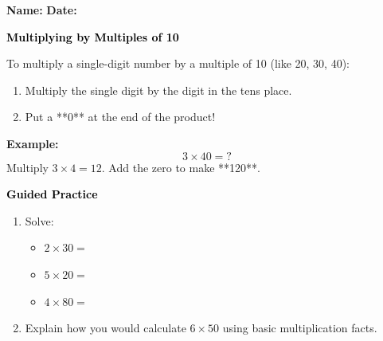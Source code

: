 \documentclass[12pt, letterpaper, fleqn]{article}
\newcommand{\blank}{\underline{\hspace{2.2cm}}}
\begin{document}
\textbf{Name:} \underline{\hspace{5cm}}
\hfill
\textbf{Date:} \underline{\hspace{3cm}}\\

\begin{tcolorbox}[colback=customteal!20]
    \large\textcolor{black}{\textbf{Multiplying by Multiples of 10}}
\end{tcolorbox}

\vspace{3mm}
\noindent
To multiply a single-digit number by a multiple of 10 (like 20, 30, 40):
\begin{enumerate}
  \item Multiply the single digit by the digit in the tens place.
  \item Put a **0** at the end of the product!
\end{enumerate}

\vspace{3mm}
\textbf{Example:}
\[
3 \times 40 = \textsf{?}
\]
Multiply $3 \times 4 = 12$. 
Add the zero to make **120**.

\newpage
\begin{tcolorbox}[colback=customteal!20]
    \large\textcolor{black}{\textbf{Guided Practice}}
\end{tcolorbox}

\vspace{5mm}
\begin{enumerate}[itemsep=2.5cm, leftmargin=0.6cm]
\item Solve:
  \begin{itemize}[itemsep=0.8cm]
    \item $2 \times 30 =$ \blank
    \item $5 \times 20 =$ \blank
    \item $4 \times 80 =$ \blank
  \end{itemize}

\item Explain how you would calculate $6 \times 50$ using basic multiplication facts.
\vspace{2.5cm}
\end{enumerate}
\end{document}
